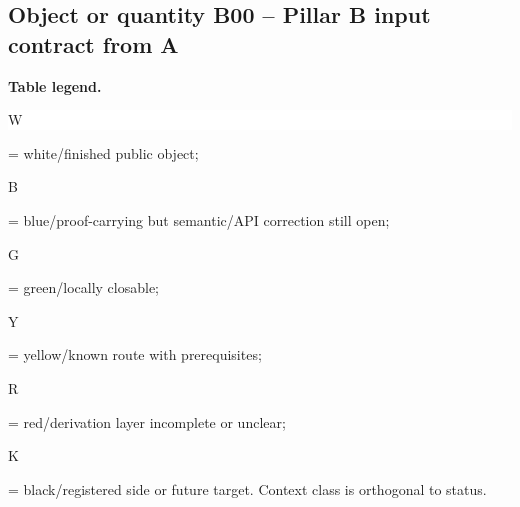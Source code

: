 \subsection*{Object or quantity B00 -- Pillar B input contract from A}
\hypertarget{objproof:B00}{}
\par\smallskip\noindent\begin{minipage}{0.99\linewidth}\footnotesize\raggedright\textbf{Table legend.} \colorbox{white}{\strut W} = white/finished public object; \colorbox{cyan!20}{\strut B} = blue/proof-carrying but semantic/API correction still open; \colorbox{green!18}{\strut G} = green/locally closable; \colorbox{yellow!25}{\strut Y} = yellow/known route with prerequisites; \colorbox{red!20}{\strut R} = red/derivation layer incomplete or unclear; \colorbox{black!18}{\strut K} = black/registered side or future target. Context class is orthogonal to status.\end{minipage}\par\vspace{0.25em}
